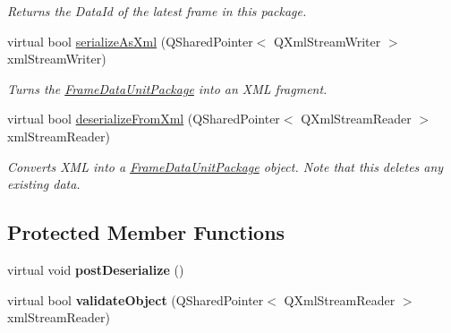 \begin{DoxyCompactItemize}
\begin{DoxyCompactList}\small\item\em Returns the Data\-Id of the latest frame in this package. \end{DoxyCompactList}\item 
virtual bool \hyperlink{class_picto_1_1_frame_data_unit_package_a9a81a193e3f974ce76de40839c98def3}{serialize\-As\-Xml} (Q\-Shared\-Pointer$<$ Q\-Xml\-Stream\-Writer $>$ xml\-Stream\-Writer)
\begin{DoxyCompactList}\small\item\em Turns the \hyperlink{class_picto_1_1_frame_data_unit_package}{Frame\-Data\-Unit\-Package} into an X\-M\-L fragment. \end{DoxyCompactList}\item 
\hypertarget{class_picto_1_1_frame_data_unit_package_a654266fc2f47cca32f67a46ab73565be}{virtual bool \hyperlink{class_picto_1_1_frame_data_unit_package_a654266fc2f47cca32f67a46ab73565be}{deserialize\-From\-Xml} (Q\-Shared\-Pointer$<$ Q\-Xml\-Stream\-Reader $>$ xml\-Stream\-Reader)}\label{class_picto_1_1_frame_data_unit_package_a654266fc2f47cca32f67a46ab73565be}

\begin{DoxyCompactList}\small\item\em Converts X\-M\-L into a \hyperlink{class_picto_1_1_frame_data_unit_package}{Frame\-Data\-Unit\-Package} object. Note that this deletes any existing data. \end{DoxyCompactList}\end{DoxyCompactItemize}
\subsection*{Protected Member Functions}
\begin{DoxyCompactItemize}
\item 
\hypertarget{class_picto_1_1_frame_data_unit_package_a2e4b365c28ba594c53c7af88729cc53b}{virtual void {\bfseries post\-Deserialize} ()}\label{class_picto_1_1_frame_data_unit_package_a2e4b365c28ba594c53c7af88729cc53b}

\item 
\hypertarget{class_picto_1_1_frame_data_unit_package_a847f8d82780557cc5c81f76aca357cbb}{virtual bool {\bfseries validate\-Object} (Q\-Shared\-Pointer$<$ Q\-Xml\-Stream\-Reader $>$ xml\-Stream\-Reader)}\label{class_picto_1_1_frame_data_unit_package_a847f8d82780557cc5c81f76aca357cbb}

\end{DoxyCompactItemize}

